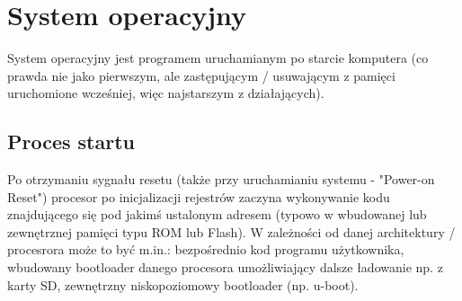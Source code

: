 % 
% 
% 
% 

\section{System operacyjny}

System operacyjny jest programem uruchamianym po starcie komputera (co prawda nie jako pierwszym, ale zastępującym / usuwającym z pamięci uruchomione wcześniej, więc najstarszym z działających).

\subsection{Proces startu}

Po otrzymaniu sygnału resetu (także przy uruchamianiu systemu - "Power-on Reset") procesor po inicjalizacji rejestrów zaczyna wykonywanie kodu znajdującego się pod jakimś ustalonym adresem (typowo w wbudowanej lub zewnętrznej pamięci typu ROM lub Flash). W zależności od danej architektury / procesrora może to być m.in.: bezpośrednio kod programu użytkownika, wbudowany bootloader danego procesora umożliwiający dalsze ładowanie np. z karty SD, zewnętrzny niskopoziomowy bootloader (np. u-boot).

